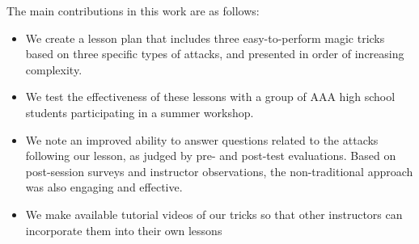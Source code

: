 The main contributions in this work are as follows:

\begin{itemize}

\item{We create a lesson plan that includes three easy-to-perform magic
  tricks based on three specific types of attacks,
    and presented in order of increasing complexity.}

\item{We test the effectiveness of these lessons with
  a group of AAA high school students
  participating in a summer workshop.}

\item{We note an improved ability to answer questions related to the
  attacks following our lesson,
    as judged by pre- and post-test evaluations.  Based on post-session
    surveys and instructor observations, the non-traditional approach was
    also engaging and effective.}

\item{We make available tutorial videos of our tricks so that other
  instructors can incorporate them into their own lessons}

\end{itemize}
